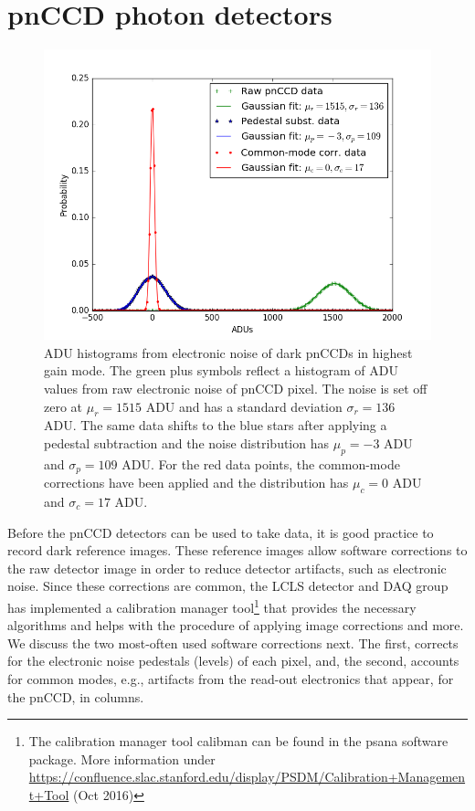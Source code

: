 \section{pnCCD photon detectors}\label{sec:pnccd-corr}
\begin{figure}
	\centering
		\includegraphics[height=0.45\textwidth]{images/pnCCD-electronic-noise.png}
	\caption[ADU histograms from electronic noise of dark pnCCDs.]{ADU histograms from electronic noise of dark pnCCDs in highest gain mode. The green plus symbols reflect a histogram of ADU values from raw electronic noise of pnCCD pixel. The noise is set off zero at $\mu_{r}=1515$ ADU and has a standard deviation $\sigma_{r}=136$ ADU. The same data shifts to the blue stars after applying a pedestal subtraction and the noise distribution has $\mu_{p}=-3$ ADU and $\sigma_{p}=109$ ADU. For the red data points, the common-mode corrections have been applied and the distribution has $\mu_{c}=0$ ADU and $\sigma_{c}=17$ ADU.}
	\label{fig:pnCCD-electronic-noise}
\end{figure}
Before the pnCCD detectors can be used to take data, it is good practice to record dark reference images. These reference images allow software corrections to the raw detector image in order to reduce detector artifacts, such as electronic noise. Since these corrections are common, the LCLS detector and DAQ group has implemented a calibration manager tool\footnote{The calibration manager tool calibman can be found in the psana software package. More information under \url{https://confluence.slac.stanford.edu/display/PSDM/Calibration+Management+Tool} (Oct 2016)} that provides the necessary algorithms and helps with the procedure of applying image corrections and more. We discuss the two most-often used software corrections next. The first, corrects for the electronic noise pedestals (levels) of each pixel, and, the second, accounts for common modes, e.g., artifacts from the read-out electronics that appear, for the pnCCD, in columns.\\[1\baselineskip]
